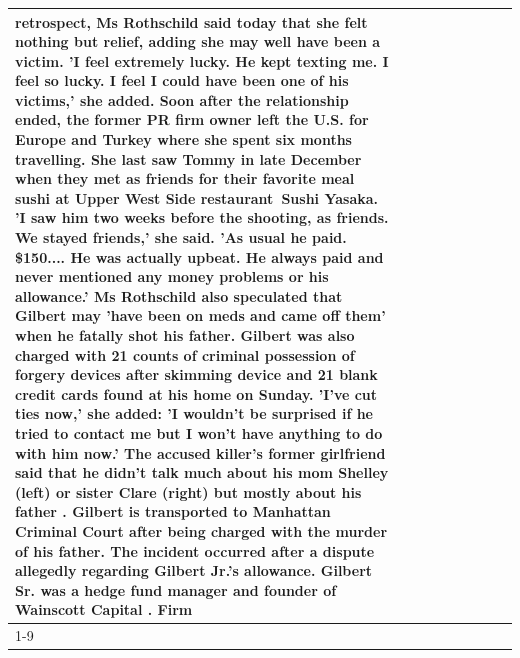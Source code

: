 \begin{table}[H]
\begin{tabular}{lllrlllll}
retrospect, Ms Rothschild said today that she felt nothing but relief, adding she may well have been a victim. 'I feel extremely lucky. He kept texting me. I feel so lucky. I feel I could have been one of his victims,' she added. Soon after the relationship ended, the former PR firm owner left the U.S. for Europe and Turkey where she spent six months  travelling. She last saw Tommy in late December when they met as friends for their favorite meal sushi at Upper West Side restaurant Sushi Yasaka. 'I saw him two weeks before the shooting, as friends. We stayed friends,' she said. 'As usual he paid. \$150.... He was actually upbeat. He always paid and never mentioned any money problems or his allowance.' Ms Rothschild also speculated that Gilbert may 'have been on meds and came off them' when he fatally shot his father. Gilbert was also charged with 21 counts of criminal possession of forgery devices after skimming device and 21 blank credit cards found at his home on Sunday. 'I've cut ties now,' she added: 'I wouldn’t be surprised if he tried to contact me but I won’t have anything to do with him now.' The accused killer's former girlfriend said that he didn't talk much about his mom Shelley (left) or sister Clare (right) but mostly about his father . Gilbert is transported to Manhattan Criminal Court  after being charged with the murder of his father. The incident occurred after a dispute allegedly regarding Gilbert Jr.'s allowance. Gilbert Sr. was a hedge fund manager and founder of Wainscott Capital . Firm \\
\cline{1-9}

\end{tabular}
\end{table}
